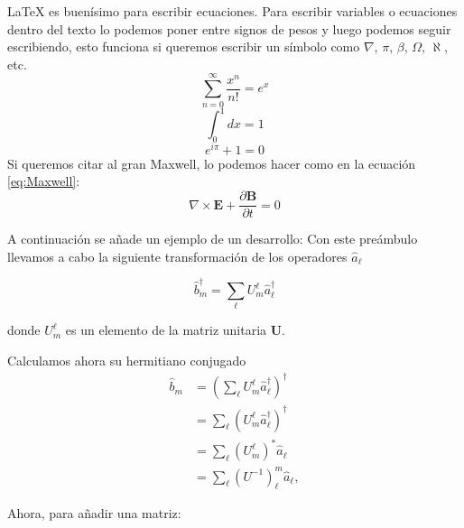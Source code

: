 \documentclass[a4paper]{article}
\begin{document}
\LaTeX{} es buenísimo para escribir ecuaciones. Para escribir variables o ecuaciones dentro del texto lo podemos poner entre signos de pesos y luego podemos seguir escribiendo, esto funciona si queremos escribir un símbolo como $\nabla$, $\pi$, $\beta$, $\Omega$, $\aleph$, etc.
\begin{equation}
\sum_{n=0}^\infty \frac{x^n}{n!}=e^x
\end{equation}
\begin{equation}
\int_{0}^{1}dx=1
\end{equation}
\begin{equation}
e^{i\pi}+1=0
\end{equation}
Si queremos citar al gran Maxwell, lo podemos hacer como en la ecuación \ref{eq:Maxwell}:
\begin{equation}
\nabla\times\mathbf{E}+\frac{\partial\mathbf{B}}{\partial t}=0\label{eq:Maxwell}
\end{equation}

A continuación se añade un ejemplo de un desarrollo:
Con este preámbulo llevamos a cabo la siguiente transformación de los operadores $\hat{a}_{\ell}$

\begin{equation}
\hat{b}_{m}^{\dagger}=\sum_{\ell}U_{m}^{\ell}\hat{a}_{\ell}^{\dagger}
\end{equation}

donde $U_{m}^{\ell}$ es un elemento de la matriz unitaria $\mathbf{U}$.

Calculamos ahora su hermitiano conjugado
\begin{align}
\hat{b}_{m} & =\left(\sum_{\ell}U_{m}^{\ell}\hat{a}_{\ell}^{\dagger}\right)^{\dagger}\label{eq:bm}\\
 & =\sum_{\ell}\left(U_{m}^{\ell}\hat{a}_{\ell}^{\dagger}\right)^{\dagger}\nonumber \\
 & =\sum_{\ell}\left(U_{m}^{\ell}\right)^{*}\hat{a}_{\ell}\nonumber \\
 & =\sum_{\ell}\left(U^{-1}\right)_{\ell}^{m}\hat{a}_{\ell},\label{eq:bSubM}
\end{align}

Ahora, para añadir una matriz:
\end{document}
